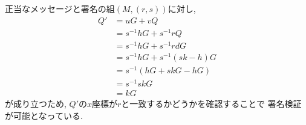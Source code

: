 \vspace{1em}
\indent 正当なメッセージと署名の組$(M, (r, s))$に対し, 
\begin{align*}
  Q'  &= uG + vQ\\
      &= s^{-1}hG + s^{-1}rQ \\
      &= s^{-1}hG + s^{-1}rdG \\
      &= s^{-1}hG + s^{-1}(sk-h)G \\
      &= s^{-1}(hG + skG - hG) \\
      &= s^{-1}skG \\
      &= kG
\end{align*}
が成り立つため, $Q'$の$x$座標が$r$と一致するかどうかを確認することで
署名検証が可能となっている.\\